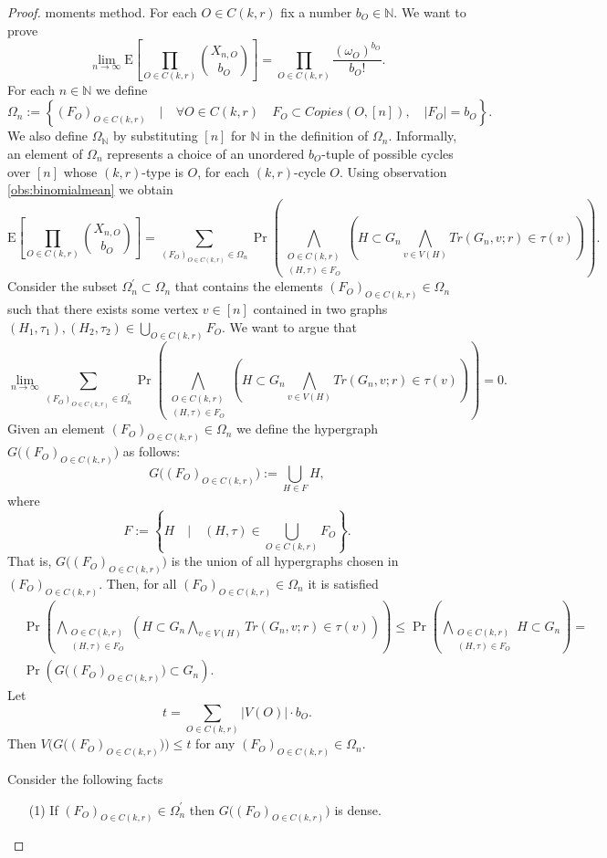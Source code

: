 \documentclass[12pt,notitlepage,a4paper]{article}
\theoremstyle{definition}
\newcommand{\N}{\mathbb{N}}
\newcommand{\Ln}{\lim\limits_{n\to \infty}}
\begin{document}
\begin{proof}
	moments method. For each $O\in C(k,r)$ fix a number $b_{O}\in\N$.
	We want to prove 
	\[
	\Ln 
	\mathrm{E}\left[
	\prod_{O\in C(k,r)}
	\binom{X_{n,O}}{b_O}
	\right]= \prod_{O\in C(k,r)} 
	\frac{(\omega_O)^{b_O}}{b_O!}.
	\]
	For each $n\in \N$ we define
	\[
	\Omega_n:=\left\{
	(F_O)_{O\in C(k,r)} \quad \Big|
	\quad \forall O\in C(k,r) \quad
	F_O\subset Copies(O,[n]), \quad
	|F_O|=b_O	
	\right\}.
	\]
	We also define $\Omega_\N$ by substituting $[n]$ for $\N$ in
	the definition of $\Omega_n$. Informally, an element of $\Omega_n$ 
	represents a choice of an unordered $b_O$-tuple
	of possible cycles over $[n]$ whose $(k,r)$-type is $O$, for each
	$(k,r)$-cycle $O$. Using observation \cref{obs:binomialmean} we obtain
	\[
	\mathrm{E}\left[
	\prod_{O\in C(k,r)}
	\binom{X_{n,O}}{b_O}
	\right]=
	\sum_{(F_O)_{O\in C(k,r)}\in \Omega_n}
	\Pr\left(
	\bigwedge_{
	\substack{
	O\in C(k,r)\\
	(H,\tau)\in F_O
	}}
	\left(
	H\subset G_n
	\bigwedge_{v\in V(H)}
	Tr(G_n,v;r)\in \tau(v)
	\right)
	\right).
	\]
	Consider the subset $\Omega_n^\prime\subset \Omega_n$ that contains
	the elements $(F_O)_{O\in C(k,r)}\in \Omega_n$ such that there exists
	some vertex $v\in [n]$ contained in two graphs
	$(H_1,\tau_1),(H_2,\tau_2)\in \bigcup_{O\in C(k,r)} F_O$. We want to argue 
	that
	\begin{equation}\label{eqn:denseconfigurations}
	\Ln
	\sum_{(F_O)_{O\in C(k,r)}\in \Omega_n^\prime}
	\Pr\left(
	\bigwedge_{
		\substack{
			O\in C(k,r)\\
			(H,\tau)\in F_O
	}}
	\left(
	H\subset G_n
	\bigwedge_{v\in V(H)}
	Tr(G_n,v;r)\in \tau(v)
	\right)
	\right)=0.
	\end{equation}
	Given an element $(F_O)_{O\in C(k,r)}\in \Omega_n$ we 
	define the hypergraph $G\Big((F_O)_{O\in C(k,r)}\Big)$ as
	follows:
	\[
	G\Big((F_O)_{O\in C(k,r)}\Big):=
	\bigcup_{H\in F} H, 
	\]
	where
	\[
	F:=\left\{
	H \quad \Big| \quad 
	(H,\tau)\in \bigcup_{O\in C(k,r)} F_O	
	\right\}.
	\]
	That is, $G\Big((F_O)_{O\in C(k,r)}\Big)$
	is the union of all hypergraphs chosen in 
	$(F_O)_{O\in C(k,r)}$. Then, for all 
	$(F_O)_{O\in C(k,r)}\in \Omega_n$ it is 
	satisfied
	\begin{align*}
	&\Pr\left(
	\bigwedge_{
		\substack{
			O\in C(k,r)\\
			(H,\tau)\in F_O
	}}
	\left(
	H\subset G_n
	\bigwedge_{v\in V(H)}
	Tr(G_n,v;r)\in \tau(v)
	\right)
	\right)
	\leq 
	\Pr\left(
	\bigwedge_{
		\substack{
			O\in C(k,r)\\
			(H,\tau)\in F_O
	}}
	H\subset G_n
	\right) =
	\\&
	\Pr \left(
	G\Big((F_O)_{O\in C(k,r)}\Big) \subset G_n
	\right).
	\end{align*}
	Let 
	\[
	t = \sum_{O\in C(k,r)} |V(O)|\cdot b_O.
	\]
	Then $V\Big(
	G\Big((F_O)_{O\in C(k,r)}\Big)
	\Big) \leq t$
	for any $(F_O)_{O\in C(k,r)}\in \Omega_n$.\par
	Consider the following facts
	\begin{itemize}
		\item[(1)] If $(F_O)_{O\in C(k,r)}\in \Omega_n^\prime$ then
		$G\big((F_O)_{O\in C(k,r)}\big)$ is dense.
		 

\end{itemize}
\end{proof}
\end{document}
